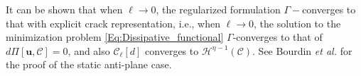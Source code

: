 It can be shown that when $\ell\rightarrow 0$, the regularized formulation $\Gamma-$converges to that with explicit crack representation, i.e., when $\ell\rightarrow0$, the solution to the minimization problem \eqref{Eq:Dissipative_functional} $\Gamma$-converges to that of $d\Pi[\bm{u},\mathcal{C}]=0$, and also $\mathcal{C}_\ell[d]$ converges to $\mathcal{H}^{\eta-1}(\mathcal{C})$. See Bourdin \emph{et al.} \cite{bourdin2008variational} for the proof of the static anti-plane case.


